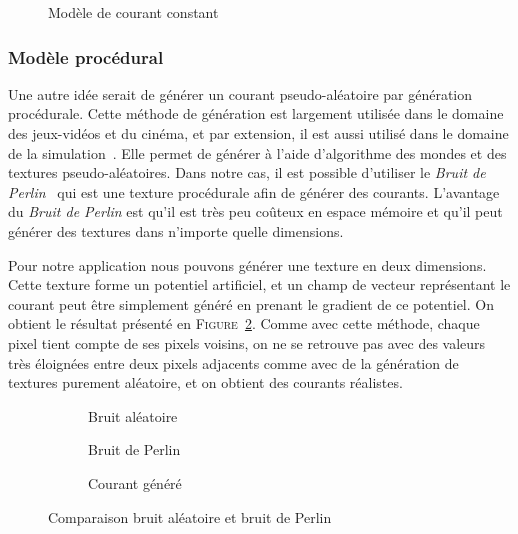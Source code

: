 				\begin{figure}[!htb]
					\centering
					\caption{Modèle de courant constant}
					\label{fig:constant}
				\end{figure}

			\subsubsection{Modèle procédural}

				Une autre idée serait de générer un courant pseudo-aléatoire par génération procédurale. Cette méthode de génération est largement utilisée dans le domaine des jeux-vidéos et du cinéma, et par extension, il est aussi utilisé dans le domaine de la simulation~\cite{generation_procedurale_monde, volumetric_terrain_generation}. Elle permet de générer à l'aide d'algorithme des mondes et des textures pseudo-aléatoires. Dans notre cas, il est possible d'utiliser le \textit{Bruit de Perlin}~\cite{PerlinNoise} qui est une texture procédurale afin de générer des courants. L'avantage du \textit{Bruit de Perlin} est qu'il est très peu coûteux en espace mémoire et qu'il peut générer des textures dans n'importe quelle dimensions. 
				
				Pour notre application nous pouvons générer une texture en deux dimensions. Cette texture forme un potentiel artificiel, et un champ de vecteur représentant le courant peut être simplement généré en prenant le gradient de ce potentiel. On obtient le résultat présenté en \textsc{Figure}~\ref{fig:perlin_noise}. Comme avec cette méthode, chaque pixel tient compte de ses pixels voisins, on ne se retrouve pas avec des valeurs très éloignées entre deux pixels adjacents comme avec de la génération de textures purement aléatoire, et on obtient des courants réalistes.

				\begin{figure}[!htb]
					\centering
					\begin{subfigure}[b]{0.32\textwidth}
						\centering
						\caption{Bruit aléatoire}
					\end{subfigure}
					\hfill
					\begin{subfigure}[b]{0.32\textwidth}
						\centering
						\caption{Bruit de Perlin}
					\end{subfigure}
					\hfill
					\begin{subfigure}[b]{0.32\textwidth}
						\centering
						\caption{Courant généré}
					\end{subfigure}
					\caption{Comparaison bruit aléatoire et bruit de Perlin}
					\label{fig:perlin_noise}
				\end{figure}

